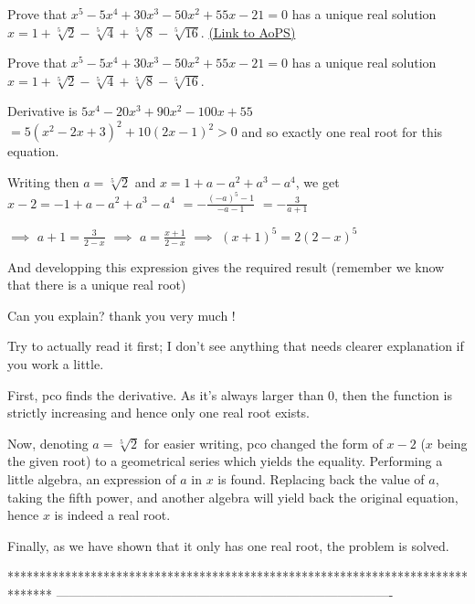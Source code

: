 \begin{problem}
	Prove that  $x^{5}-5x^{4}+30x^{3}-50x^{2}+55x-21=0$ has a unique real solution $x=1+\sqrt[5]{2}-\sqrt[5]{4}+\sqrt[5]{8}-\sqrt[5]{16}$.
	\flushright \href{https://artofproblemsolving.com/community/c6h480318}{(Link to AoPS)}
\end{problem}



\begin{solution}
	\begin{tcolorbox}Prove that  $x^{5}-5x^{4}+30x^{3}-50x^{2}+55x-21=0$ has a unique real solution $x=1+\sqrt[5]{2}-\sqrt[5]{4}+\sqrt[5]{8}-\sqrt[5]{16}$.\end{tcolorbox}
Derivative is $5x^4-20x^3+90x^2-100x+55$ $=5(x^2-2x+3)^2+10(2x-1)^2>0$ and so exactly one real root for this equation.

Writing then $a=\sqrt[5]2$ and $x=1+a-a^2+a^3-a^4$, we get $x-2=-1+a-a^2+a^3-a^4$ $=-\frac{(-a)^5-1}{-a-1}$ $=-\frac 3{a+1}$

$\implies$ $a+1=\frac 3{2-x}$ $\implies$ $a=\frac {x+1}{2-x}$ $\implies$ $(x+1)^5=2(2-x)^5$

And developping this expression gives the required result (remember we know that there is a unique real root)
\end{solution}



\begin{solution}
	Can you  explain?  thank you very much !
\end{solution}



\begin{solution}
	Try to actually read it first; I don't see anything that needs clearer explanation if you work a little.

First, pco finds the derivative. As it's always larger than 0, then the function is strictly increasing and hence only one real root exists.

Now, denoting $a = \sqrt[5]{2}$ for easier writing, pco changed the form of $x-2$ ($x$ being the given root) to a geometrical series which yields the equality. Performing a little algebra, an expression of $a$ in $x$ is found. Replacing back the value of $a$, taking the fifth power, and another algebra will yield back the original equation, hence $x$ is indeed a real root.

Finally, as we have shown that it only has one real root, the problem is solved.
\end{solution}
*******************************************************************************
-------------------------------------------------------------------------------

